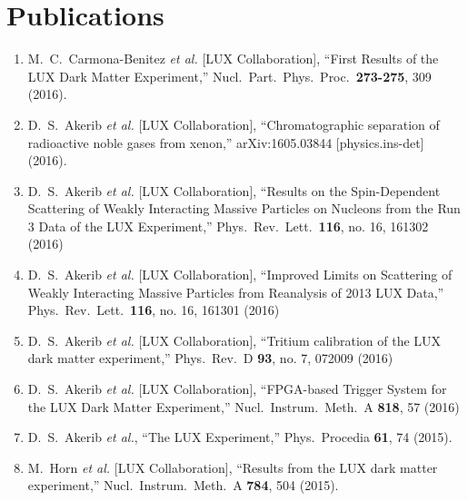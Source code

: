 \documentclass[a4paper,10pt]{article}
\begin{document}
\section{Publications}
\begin{enumerate}  
\item M.~C.~Carmona-Benitez {\it et al.} [LUX Collaboration],
  ``First Results of the LUX Dark Matter Experiment,''
  Nucl.\ Part.\ Phys.\ Proc.\  {\bf 273-275}, 309 (2016).
  
\item D.~S.~Akerib {\it et al.} [LUX Collaboration],
  ``Chromatographic separation of radioactive noble gases from xenon,''
  arXiv:1605.03844 [physics.ins-det] (2016).
  
\item   D.~S.~Akerib {\it et al.} [LUX Collaboration],
  ``Results on the Spin-Dependent Scattering of Weakly Interacting Massive Particles on Nucleons from the Run 3 Data of the LUX Experiment,''
  Phys.\ Rev.\ Lett.\  {\bf 116}, no. 16, 161302 (2016)
  
\item   D.~S.~Akerib {\it et al.} [LUX Collaboration],
  ``Improved Limits on Scattering of Weakly Interacting Massive Particles from Reanalysis of 2013 LUX Data,''
  Phys.\ Rev.\ Lett.\  {\bf 116}, no. 16, 161301 (2016)
  
\item   D.~S.~Akerib {\it et al.} [LUX Collaboration],
  ``Tritium calibration of the LUX dark matter experiment,''
  Phys.\ Rev.\ D {\bf 93}, no. 7, 072009 (2016)
  
\item   D.~S.~Akerib {\it et al.} [LUX Collaboration],
  ``FPGA-based Trigger System for the LUX Dark Matter Experiment,''
  Nucl.\ Instrum.\ Meth.\ A {\bf 818}, 57 (2016)
  
\item   D.~S.~Akerib {\it et al.},
  ``The LUX Experiment,''
  Phys.\ Procedia {\bf 61}, 74 (2015).
  
\item M.~Horn {\it et al.} [LUX Collaboration],
  ``Results from the LUX dark matter experiment,''
  Nucl.\ Instrum.\ Meth.\ A {\bf 784}, 504 (2015).
  

\end{enumerate}
\end{document}
